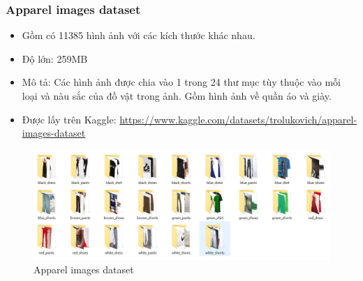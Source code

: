 \subsubsection{Apparel images dataset}
\begin{itemize}
    \item Gồm có 11385 hình ảnh với các kích thước khác nhau.
    \item Độ lớn: 259MB
    \item Mô tả: Các hình ảnh được chia vào 1 trong 24 thư mục tùy thuộc vào mỗi loại và nàu sắc của đồ vật trong ảnh. Gồm hình ảnh về quần áo và giày.
    \item Được lấy trên Kaggle: \href{https://www.kaggle.com/datasets/trolukovich/apparel-images-dataset}{https://www.kaggle.com/datasets/trolukovich/apparel-images-dataset}
\end{itemize}
\begin{center}
    \begin{figure}[!h]
        \centering
        \includegraphics[scale = 0.45]{fileanh/45.jpg}
        \caption{Apparel images dataset}
    \end{figure}
\end{center}


